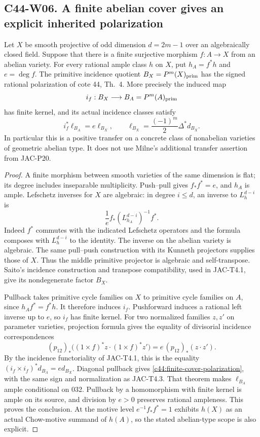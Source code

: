 \subsection*{C44-W06. A finite abelian cover gives an explicit inherited polarization}

\begin{theorem}
Let $X$ be smooth projective of odd dimension $d=2m-1$ over an
algebraically closed field. Suppose that there is a finite surjective
morphism $f:A\to X$ from an abelian variety. For every rational ample
class $h$ on $X$, put $h_A=f^*h$ and $e=\deg f$. The primitive
incidence quotient $B_X=P^m(X)_{\rm prim}$ has the signed rational
polarization of cote 44, Th.~4. More precisely the induced map
\[
 i_f:B_X\longrightarrow B_A=P^m(A)_{\rm prim}
\]
has finite kernel, and its actual incidence classes satisfy
\begin{equation}\label{c44:finite-cover-polarization}
 i_f^*\ell_{B_A}=e\ell_{B_X},\qquad
 \ell_{B_X}=\frac{(-1)^m}{2}\Delta^*d_{B_X}.
\end{equation}
In particular this is a positive transfer on a concrete class of
nonabelian varieties of geometric abelian type. It does not use
Milne's additional transfer assertion from JAC-P20.
\end{theorem}

\begin{proof}
A finite morphism between smooth varieties of the same dimension is
flat; its degree includes inseparable multiplicity. Push--pull gives
$f_*f^*=e$, and $h_A$ is ample. Lefschetz inverses for $X$ are
algebraic: in degree $i\leq d$, an inverse to $L_h^{d-i}$ is
\[
 \frac1e f_* (L_{h_A}^{d-i})^{-1}f^*.
\]
Indeed $f^*$ commutes with the indicated Lefschetz operators and
the formula composes with $L_h^{d-i}$ to the identity. The inverse
on the abelian variety is algebraic. The same pull--push construction
with its Kunneth projectors supplies those of $X$. Thus the middle
primitive projector is algebraic and self-transpose. Saito's
incidence construction and transpose compatibility, used in
JAC-T4.1, give its nondegenerate factor $B_X$.

Pullback takes primitive cycle families on $X$ to primitive cycle
families on $A$, since $h_Af^*=f^*h$. It therefore induces $i_f$.
Pushforward induces a rational left inverse up to $e$, so $i_f$ has
finite kernel. For two normalized families $z,z'$ on parameter
varieties, projection formula gives the equality of divisorial
incidence correspondences
\[
 (p_{12})_*\bigl((1\times f)^*z\cdot(1\times f)^*z'\bigr)
   =e\,(p_{12})_*(z\cdot z').
\]
By the incidence functoriality of JAC-T4.1, this is the equality
$(i_f\times i_f)^*d_{B_A}=e d_{B_X}$. Diagonal pullback gives
\eqref{c44:finite-cover-polarization}, with the same sign and
normalization as JAC-T4.3. That theorem makes $\ell_{B_A}$ ample
conditional on 032. Pullback by a homomorphism with finite kernel
is ample on its source, and division by $e>0$ preserves rational
ampleness. This proves the conclusion. At the motive level
$e^{-1}f_*f^*=1$ exhibits $h(X)$ as an actual Chow-motive summand
of $h(A)$, so the stated abelian-type scope is also explicit.
\end{proof}

